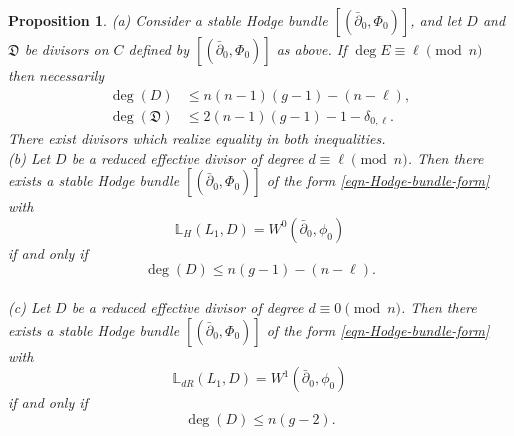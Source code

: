 \documentclass[twoside, 11pt]{article}
\numberwithin{equation}{section}
\theoremstyle{theorem}
\numberwithin{theorem}{section}
\newtheorem{proposition}[proposition]{Proposition}
\theoremstyle{definition}
\newcommand{\pa}{\partial}
\begin{document}
\begin{proposition}\label{Dbounds}
(a) Consider a stable Hodge bundle $[(\bar\pa_0,\Phi_0)]$, and let $D$ and $\mathfrak D$ be divisors on $C$ defined by $[(\bar\pa_0,\Phi_0)]$ as above. If $\deg E \equiv \ell \pmod{n}$ then necessarily 
%
\begin{equation*}
\begin{split}
\deg(D) &\le n(n-1)(g-1)-(n-\ell),\\
\deg(\mathfrak D)&\le 2(n-1)(g-1) -1- \delta_{0,\ell}.
\end{split}
\end{equation*}
%
There exist divisors which realize equality in both inequalities. 
\\
(b) Let $D$ be a reduced effective divisor of degree $d \equiv \ell \pmod{n}$.
Then there exists a stable Hodge bundle $[(\bar\pa_0,\Phi_0)]$ of the form \eqref{eqn-Hodge-bundle-form} with  
\[\mathbb L_H(L_1,D) = W^0(\bar\pa_0,\phi_0) \]
if and only if 
%
\begin{equation*}
\deg(D) \le n(g-1)-(n-\ell). 
\end{equation*}
%
\\
(c) Let $D$ be a reduced effective divisor of degree $d \equiv 0 \pmod{n}$.
Then there exists a stable Hodge bundle $[(\bar\pa_0,\Phi_0)]$ of the form \eqref{eqn-Hodge-bundle-form} with 
\[\mathbb L_{dR}(L_1,D) = W^1(\bar\pa_0,\phi_0) \]
if and only if 
%
\begin{equation*}
\deg(D) \le  n(g-2).
\end{equation*}
\end{proposition}
%
%
\end{document}
